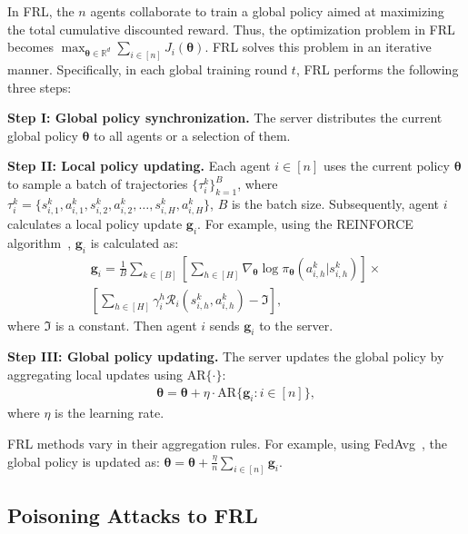 %
In FRL, the $n$ agents collaborate to train a global policy aimed at maximizing the total cumulative discounted reward. Thus, the optimization problem in FRL becomes
$
\label{frl_opt}
\max_{\bm{\theta} \in \mathbb{R}^d} \sum_{i\in [n]} J_i(\boldsymbol{\theta}).
$
%
%
%
FRL solves this problem in an iterative manner.
Specifically, in each global training round $t$, FRL performs the following three steps:
\begin{list}{}{\leftmargin=1em \itemindent=-0.08em \itemsep=.2em}
\item \textbf{Step I: Global policy synchronization.} 
The server distributes the current global policy $\bm{\theta}$ to all agents or a selection of them.


\item \textbf{Step II: Local policy updating.} 
Each agent $i \in [n]$ uses the current policy $\bm{\theta}$ to sample a batch of trajectories $\{\tau_{i}^k\}_{k=1}^B$, where $\tau_i^k=\{s_{i,1}^k,a_{i,1}^k,s_{i,2}^k,a_{i,2}^k,\ldots,s_{i,H}^k,a_{i,H}^k\}$, $B$ is the batch size.
Subsequently, agent $i$ calculates a local policy update $\bm{g}_i$.
For example, using the REINFORCE algorithm~\cite{williams1992simple}, $\bm{g}_i$ is calculated as:
\begin{align}
\label{gradient_i}
\bm{g}_i = \frac{1}{B} \sum_{k \in [B]}  \left[
 \sum_{h \in [H]}\nabla_{\bm{\theta}}\log \pi_{\bm{\theta}}(a_{i,h}^k|s_{i,h}^k)\right] \times  \nonumber \\
 \left[\sum_{h\in [H]}\gamma_i^h \mathcal{R}_i(s_{i,h}^k,a_{i,h}^{k})- \Im   \right],
\end{align}
where $\Im$ is a constant. Then agent $i$ sends $\bm{g}_i$ to the server.


\item \textbf{Step III: Global policy updating.} 
The server updates the global policy by aggregating local updates using $\text{AR}\{\cdot\}$:
\begin{align}
\bm{\theta} = \bm{\theta} + \eta \cdot \text{AR} \{\bm{g}_i: i \in [n]\},
\end{align}
where $\eta$ is the learning rate.

\end{list}

FRL methods vary in their aggregation rules.
For example, using FedAvg~\cite{mcmahan2017communication}, the global policy is updated as:
 $\bm{\theta} = \bm{\theta} + \frac{\eta}{n} \sum_{i \in [n]}\bm{g}_i$.


\subsection{Poisoning Attacks to FRL}


